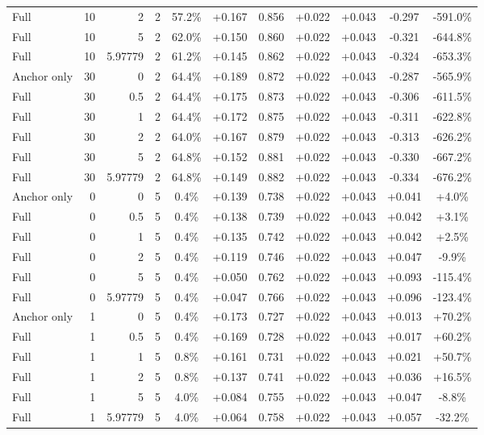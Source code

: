 \begin{table}[htbp]
\begin{tabular}{lrrrccccccc}
Full & 10 & 2 & 2 & 57.2\% & +0.167 & 0.856 & +0.022 & +0.043 & -0.297 & -591.0\% \\
Full & 10 & 5 & 2 & 62.0\% & +0.150 & 0.860 & +0.022 & +0.043 & -0.321 & -644.8\% \\
Full & 10 & 5.97779 & 2 & 61.2\% & +0.145 & 0.862 & +0.022 & +0.043 & -0.324 & -653.3\% \\
Anchor only & 30 & 0 & 2 & 64.4\% & +0.189 & 0.872 & +0.022 & +0.043 & -0.287 & -565.9\% \\
Full & 30 & 0.5 & 2 & 64.4\% & +0.175 & 0.873 & +0.022 & +0.043 & -0.306 & -611.5\% \\
Full & 30 & 1 & 2 & 64.4\% & +0.172 & 0.875 & +0.022 & +0.043 & -0.311 & -622.8\% \\
Full & 30 & 2 & 2 & 64.0\% & +0.167 & 0.879 & +0.022 & +0.043 & -0.313 & -626.2\% \\
Full & 30 & 5 & 2 & 64.8\% & +0.152 & 0.881 & +0.022 & +0.043 & -0.330 & -667.2\% \\
Full & 30 & 5.97779 & 2 & 64.8\% & +0.149 & 0.882 & +0.022 & +0.043 & -0.334 & -676.2\% \\
Anchor only & 0 & 0 & 5 & 0.4\% & +0.139 & 0.738 & +0.022 & +0.043 & +0.041 & +4.0\% \\
Full & 0 & 0.5 & 5 & 0.4\% & +0.138 & 0.739 & +0.022 & +0.043 & +0.042 & +3.1\% \\
Full & 0 & 1 & 5 & 0.4\% & +0.135 & 0.742 & +0.022 & +0.043 & +0.042 & +2.5\% \\
Full & 0 & 2 & 5 & 0.4\% & +0.119 & 0.746 & +0.022 & +0.043 & +0.047 & -9.9\% \\
Full & 0 & 5 & 5 & 0.4\% & +0.050 & 0.762 & +0.022 & +0.043 & +0.093 & -115.4\% \\
Full & 0 & 5.97779 & 5 & 0.4\% & +0.047 & 0.766 & +0.022 & +0.043 & +0.096 & -123.4\% \\
Anchor only & 1 & 0 & 5 & 0.4\% & +0.173 & 0.727 & +0.022 & +0.043 & +0.013 & +70.2\% \\
Full & 1 & 0.5 & 5 & 0.4\% & +0.169 & 0.728 & +0.022 & +0.043 & +0.017 & +60.2\% \\
Full & 1 & 1 & 5 & 0.8\% & +0.161 & 0.731 & +0.022 & +0.043 & +0.021 & +50.7\% \\
Full & 1 & 2 & 5 & 0.8\% & +0.137 & 0.741 & +0.022 & +0.043 & +0.036 & +16.5\% \\
Full & 1 & 5 & 5 & 4.0\% & +0.084 & 0.755 & +0.022 & +0.043 & +0.047 & -8.8\% \\
Full & 1 & 5.97779 & 5 & 4.0\% & +0.064 & 0.758 & +0.022 & +0.043 & +0.057 & -32.2\% \\

\end{tabular}
\end{table}
